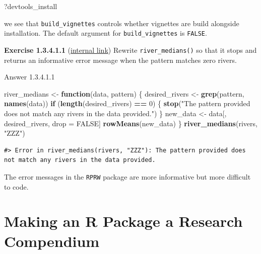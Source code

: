 \documentclass[
]{book}
\newenvironment{Shaded}{\begin{snugshade}}{\end{snugshade}}
\newcommand{\ControlFlowTok}[1]{\textcolor[rgb]{0.13,0.29,0.53}{\textbf{#1}}}
\newcommand{\DecValTok}[1]{\textcolor[rgb]{0.00,0.00,0.81}{#1}}
\newcommand{\KeywordTok}[1]{\textcolor[rgb]{0.13,0.29,0.53}{\textbf{#1}}}
\newcommand{\NormalTok}[1]{#1}
\newcommand{\OperatorTok}[1]{\textcolor[rgb]{0.81,0.36,0.00}{\textbf{#1}}}
\newcommand{\OtherTok}[1]{\textcolor[rgb]{0.56,0.35,0.01}{#1}}
\newcommand{\StringTok}[1]{\textcolor[rgb]{0.31,0.60,0.02}{#1}}
\begin{document}
\begin{Shaded}
\begin{Highlighting}[]
\NormalTok{?devtools_install}
\end{Highlighting}
\end{Shaded}

we see that \texttt{build\_vignettes} controls whether vignettes are build alongside installation. The default argument for \texttt{build\_vignettes} is \texttt{FALSE}.

\textbf{Exercise 1.3.4.1.1} (\protect\hyperlink{ex-set6}{internal link})
Rewrite \texttt{river\_medians()} so that it stops and returns an informative error message when the pattern matches zero rivers.

Answer 1.3.4.1.1

\begin{Shaded}
\begin{Highlighting}[]
\NormalTok{river_medians <-}\StringTok{ }\ControlFlowTok{function}\NormalTok{(data, pattern) \{}
\NormalTok{  desired_rivers <-}\StringTok{ }\KeywordTok{grep}\NormalTok{(pattern, }\KeywordTok{names}\NormalTok{(data))}
  \ControlFlowTok{if}\NormalTok{ (}\KeywordTok{length}\NormalTok{(desired_rivers) }\OperatorTok{==}\StringTok{ }\DecValTok{0}\NormalTok{) \{}
    \KeywordTok{stop}\NormalTok{(}\StringTok{"The pattern provided does not match any rivers in the data provided."}\NormalTok{)}
\NormalTok{  \}}
\NormalTok{  new_data <-}\StringTok{ }\NormalTok{data[, desired_rivers, drop =}\StringTok{ }\OtherTok{FALSE}\NormalTok{]}
  \KeywordTok{rowMeans}\NormalTok{(new_data)}
\NormalTok{\}}
\KeywordTok{river_medians}\NormalTok{(rivers, }\StringTok{"ZZZ"}\NormalTok{)}
\end{Highlighting}
\end{Shaded}

\begin{verbatim}
#> Error in river_medians(rivers, "ZZZ"): The pattern provided does not match any rivers in the data provided.
\end{verbatim}

The error messages in the \texttt{RPRW} package are more informative but more difficult to code.

\hypertarget{making-an-r-package-a-research-compendium}{%
\section*{Making an R Package a Research Compendium}\label{making-an-r-package-a-research-compendium}}
\end{document}
